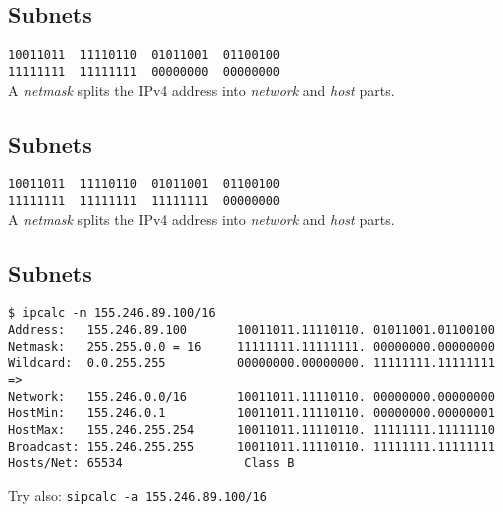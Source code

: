 \documentclass[xga]{xdvislides}
\begin{document}
\subsection{Subnets}
\vspace{.5in}
\Hugesize
\begin{center}
\verb|10011011  11110110  01011001  01100100| \\

\verb|11111111  11111111  00000000  00000000| \\
\vspace{.5in}
A {\em netmask} splits the IPv4 address into {\em network} and {\em host}
parts.
\end{center}
\Normalsize

\subsection{Subnets}
\vspace{.5in}
\Hugesize
\begin{center}
\verb|10011011  11110110  01011001  01100100| \\

\verb|11111111  11111111  11111111  00000000| \\
\vspace{.5in}
A {\em netmask} splits the IPv4 address into {\em network} and {\em host}
parts.
\end{center}
\Normalsize

\subsection{Subnets}
\begin{verbatim}
$ ipcalc -n 155.246.89.100/16
Address:   155.246.89.100       10011011.11110110. 01011001.01100100
Netmask:   255.255.0.0 = 16     11111111.11111111. 00000000.00000000
Wildcard:  0.0.255.255          00000000.00000000. 11111111.11111111
=>
Network:   155.246.0.0/16       10011011.11110110. 00000000.00000000
HostMin:   155.246.0.1          10011011.11110110. 00000000.00000001
HostMax:   155.246.255.254      10011011.11110110. 11111111.11111110
Broadcast: 155.246.255.255      10011011.11110110. 11111111.11111111
Hosts/Net: 65534                 Class B
\end{verbatim}
\vspace{.5in}
Try also: \verb+sipcalc -a 155.246.89.100/16+
\end{document}
